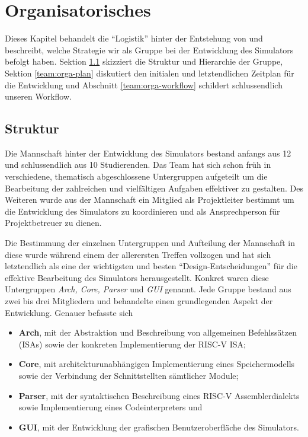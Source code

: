 
\section{Organisatorisches}
\label{team:orga}

Dieses Kapitel behandelt die ``Logistik'' hinter der Entstehung von \erasim und beschreibt, welche Strategie wir als Gruppe bei der Entwicklung des Simulators befolgt haben. Sektion \ref{team:orga-structure} skizziert die Struktur und Hierarchie der Gruppe, Sektion \ref{team:orga-plan} diskutiert den initialen und letztendlichen Zeitplan für die Entwicklung und Abschnitt \ref{team:orga-workflow} schildert schlussendlich unseren Workflow.

\subsection{Struktur}
\label{team:orga-structure}

Die Mannschaft hinter der Entwicklung des \erasim Simulators bestand anfangs aus 12 und schlussendlich aus 10 Studierenden. Das Team hat sich schon früh in verschiedene, thematisch abgeschlossene Untergruppen aufgeteilt um die Bearbeitung der zahlreichen und vielfältigen Aufgaben effektiver zu gestalten. Des Weiteren wurde aus der Mannschaft ein Mitglied als Projektleiter bestimmt um die Entwicklung des Simulators zu koordinieren und als Ansprechperson für Projektbetreuer zu dienen.

Die Bestimmung der einzelnen Untergruppen und Aufteilung der Mannschaft in diese wurde während einem der allerersten Treffen vollzogen und hat sich letztendlich als eine der wichtigsten und besten ``Design-Entscheidungen'' für die effektive Bearbeitung des Simulators herausgestellt. Konkret waren diese Untergruppen \emph{Arch, Core, Parser} und \emph{GUI} genannt. Jede Gruppe bestand aus zwei bis drei Mitgliedern und behandelte einen grundlegenden Aspekt der Entwicklung. Genauer befasste sich
\begin{itemize}
  \item \textbf{Arch}, mit der Abstraktion und Beschreibung von allgemeinen Befehlssätzen (ISAs) sowie der konkreten Implementierung der RISC-V ISA;
  \item \textbf{Core}, mit architekturunabhängigen Implementierung eines Speichermodells sowie der Verbindung der Schnittstellten sämtlicher Module;
  \item \textbf{Parser}, mit der syntaktischen Beschreibung eines RISC-V Assemblerdialekts sowie Implementierung eines Codeinterpreters und
  \item \textbf{GUI}, mit der Entwicklung der grafischen Benutzeroberfläche des Simulators.
\end{itemize}

